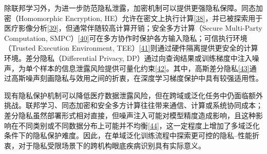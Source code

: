 除联邦学习外，为进一步防范隐私泄露，加密机制可以提供更强隐私保障。同态加密（Homomorphic Encryption, HE）允许在密文上执行计算\hyperref[_Ref213950427]{{[}38{]}}，并已被探索用于医疗影像分析\hyperref[_Ref213950433]{{[}39{]}}，但通常伴随较高计算开销；安全多方计算（Secure Multi-Party Computation, SMPC）\hyperref[_Ref213950438]{{[}40{]}}可在多方协作时保护各方输入隐私；可信执行环境（Trusted Execution Environment, TEE）\hyperref[_Ref213950453]{{[}41{]}}则通过硬件隔离提供更安全的计算环境。差分隐私（Differential Privacy, DP）通过向查询结果或训练梯度中注入噪声，为单个样本的信息泄露风险提供可量化约束\hyperref[_Ref213950443]{{[}42{]}}。其中，高斯差分隐私\hyperref[_Ref213950449]{{[}43{]}}通过高斯噪声刻画隐私与效用之间的折衷，在深度学习梯度保护中具有较强适用性。

现有隐私保护机制可以降低医疗数据泄露风险，但在跨域或泛化任务中仍面临额外挑战。联邦学习、同态加密和安全多方计算往往带来通信、计算或系统协同成本；差分隐私虽然部署形式相对直接，但噪声注入可能对模型精度造成影响，且这种影响在不同类别或不同数据分布上可能并不均衡\hyperref[_Ref213950458]{{[}44{]}}，这一定程度上增加了多域泛化条件下的隐私保护难度。因此，在单域泛化训练流程中探索更可控的隐私--性能折衷，对于隐私受限场景下的跨机构眼底疾病识别具有实际意义。
